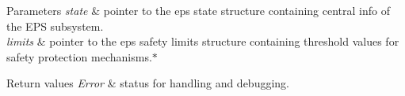 \begin{DoxyParams}{Parameters}
{\em state} & pointer to the eps state structure containing central info of the E\-P\-S subsystem. \\
\hline
{\em limits} & pointer to the eps safety limits structure containing threshold values for safety protection mechanisms.$\ast$ \\
\hline
\end{DoxyParams}

\begin{DoxyRetVals}{Return values}
{\em Error} & status for handling and debugging. \\
\hline
\end{DoxyRetVals}
